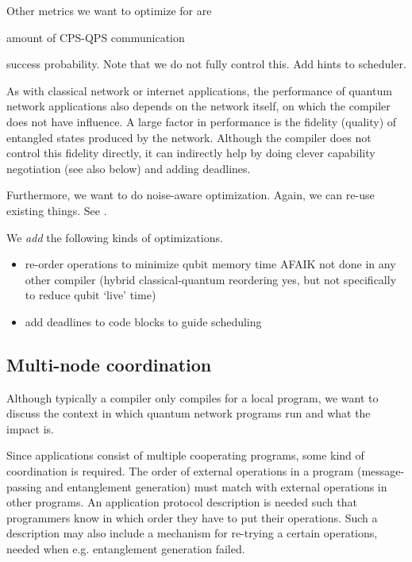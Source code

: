 Other metrics we want to optimize for are
\begin{inlinelist}
\item amount of CPS-QPS communication
\item success probability. Note that we do not fully control this. Add hints to scheduler.
\end{inlinelist}

As with classical network or internet applications, the performance of quantum network applications also depends on the network itself, on which the compiler does not have influence.
A large factor in performance is the fidelity (quality) of entangled states produced by the network.
Although the compiler does not control this fidelity directly, it can indirectly help by doing clever capability negotiation (see also below) and adding deadlines.

Furthermore, we want to do noise-aware optimization.
Again, we can re-use existing things. See \cite{smith_error_2021, murali_noise-adaptive_2019}.

We \textit{add} the following kinds of optimizations.
\begin{itemize}
  \item re-order operations to minimize qubit memory time
    AFAIK not done in any other compiler (hybrid classical-quantum reordering yes, but not specifically to reduce qubit `live' time)
  \item add deadlines to code blocks to guide scheduling
\end{itemize}




\subsection{Multi-node coordination}
Although typically a compiler only compiles for a local program, we want to discuss the context in which quantum network programs run and what the impact is.

Since applications consist of multiple cooperating programs, some kind of coordination is required.
The order of external operations in a program (message-passing and entanglement generation) must match with external operations in other programs.
An application protocol description is needed such that programmers know in which order they have to put their operations.
Such a description may also include a mechanism for re-trying a certain operations, needed when e.g. entanglement generation failed.

